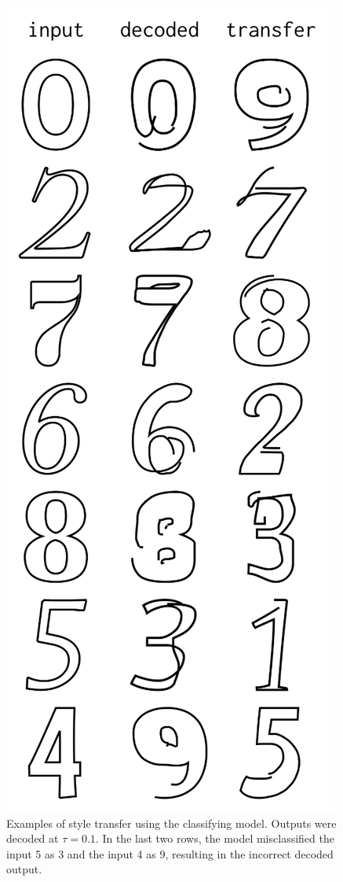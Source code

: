 \begin{figure}[h]
    \centering
	\includegraphics[height=0.9\textheight]{figures/style_trans}
    \caption[Examples of style transfer using the classifying model]
    {Examples of style transfer using the classifying model.
    Outputs were decoded at $\tau=0.1$.
    In the last two rows, the model misclassified the input 5 as 3 and the input 4 as 9, resulting in the incorrect decoded output.
    \label{fig:style-trans}}
\end{figure}
